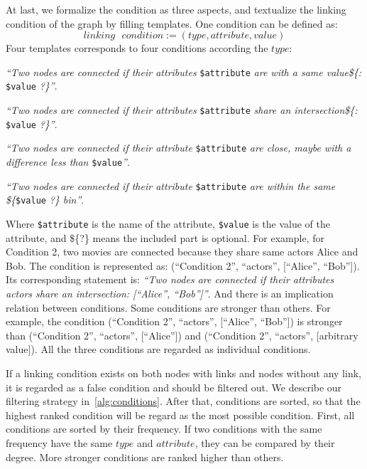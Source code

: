 At last, we formalize the condition as three aspects, and textualize the linking condition of the graph by filling templates. 
One condition can be defined as:
\begin{equation}
    linking\text{ }condition := ( type, attribute, value )
\end{equation}
Four templates corresponds to four conditions according the $type$:
\begin{compactenum}[\textbf{C}1]
    \item \textit{``Two nodes are connected if their attributes} \texttt{\$attribute} \textit{are with a same value\$\{: }\texttt{\$value} \textit{?\}''}.
    \item \textit{``Two nodes are connected if their attributes} \texttt{\$attribute} \textit{share an intersection\$\{: }\texttt{\$value} \textit{?\}''}.
    \item \textit{``Two nodes are connected if their attribute} \texttt{\$attribute} \textit{are close, maybe with a difference less than } \texttt{\$value}\textit{''}.
    \item \textit{``Two nodes are connected if their attribute} \texttt{\$attribute} \textit{are within the same \$\{}\texttt{\$value}\textit{ ?\} bin''}.
\end{compactenum}

Where \texttt{\$attribute} is the name of the attribute, \texttt{\$value} is the value of the attribute, and \$\{?\} means the included part is optional. 
For example, for Condition 2, two movies are connected because they share same actors Alice and Bob. 
The condition is represented as: (``Condition 2'', ``actors'', [``Alice'', ``Bob'']). 
Its corresponding statement is: \textit{``Two nodes are connected if their attributes actors share an intersection: [``Alice'', ``Bob'']''}. 
And there is an implication relation between conditions.
Some conditions are stronger than others.
For example, the condition (``Condition 2'', ``actors'', [``Alice'', ``Bob'']) is stronger than (``Condition 2'', ``actors'', [``Alice'']) and (``Condition 2'', ``actors'', [arbitrary value]).
All the three conditions are regarded as individual conditions.

If a linking condition exists on both nodes with links and nodes without any link, it is regarded as a false condition and should be filtered out.
We describe our filtering strategy in~\ref{alg:conditions}.
After that, conditions are sorted, so that the highest ranked condition will be regard as the most possible condition.
First, all conditions are sorted by their frequency.
If two conditions with the same frequency have the same $type$ and $attribute$, they can be compared by their degree.
More stronger conditions are ranked higher than others.



